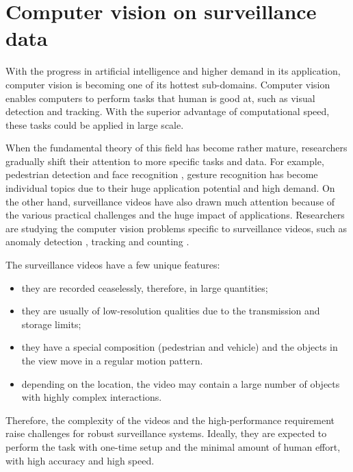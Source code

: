 \section{Computer vision on surveillance data}
\label{sec:intro-cv}


With the progress in artificial intelligence and higher demand in its application, computer vision is becoming one of its hottest sub-domains. 
Computer vision enables computers to perform tasks that human is good at, such as visual detection and tracking. 
With the superior advantage of computational speed, these tasks could be applied in large scale.

When the fundamental theory of this field has become rather mature, researchers gradually shift their attention to more specific tasks and data. For example, pedestrian detection \cite{dollar2012pedestrian} and face recognition \cite{parkhi2015deep}, gesture recognition \cite{rautaray2015vision} has become individual topics due to their huge application potential and high demand.
On the other hand, surveillance videos have also drawn much attention because of the various practical challenges and the huge impact of applications. 
Researchers are studying the computer vision problems specific to surveillance videos, such as anomaly detection \cite{scime2018anomaly}, tracking \cite{wu2015object} and counting \cite{seenouvong2016computer}. 


The surveillance videos have a few unique features: 
\begin{itemize}
\item they are recorded ceaselessly, therefore, in large quantities; 
\item they are usually of low-resolution qualities due to the transmission and storage limits;
\item they have a special composition (pedestrian and vehicle) and the objects in the view move in a regular motion pattern.
\item depending on the location, the video may contain a large number of objects with highly complex interactions.
\end{itemize}

Therefore, the complexity of the videos and the high-performance requirement raise challenges for robust surveillance systems. 
Ideally, they are expected to perform the task with one-time setup and the minimal amount of human effort, with high accuracy and high speed.